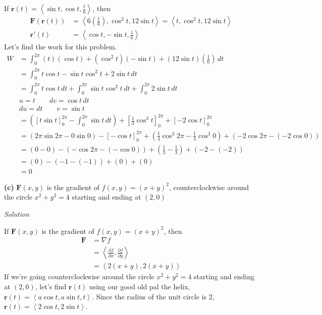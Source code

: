 \documentclass{article}
\newcommand{\lrp}[1]{\left( #1 \right)}
\newcommand{\lra}[1]{\left\langle #1 \right\rangle}
\newcommand{\lrb}[1]{\left[ #1 \right]}
\renewcommand{\r}[0]{\mathbf{r}}
\newcommand{\F}[0]{\mathbf{F}}
\newcommand{\Solution}{\textit{Solution}}
\begin{document}
If $\displaystyle\r(t)=\lra{\sin t, \cos t, \frac{t}{6}}$, then
\begin{align*}
    \F\lrp{\r(t)}&=\lra{6\lrp{\frac{t}{6}},\cos^2t,12\sin t}=\lra{t,\cos^2 t, 12\sin t}\\
    \r'(t)&=\lra{\cos t, -\sin t, \frac{1}{6}}
\end{align*}
Let's find the work for this problem.
\begin{align*}
    W&=\int_0^{2\pi} (t)(\cos t)+(\cos^2t)(- \sin t) + \lrp{12\sin t}\lrp{\frac{1}{6}}\,dt\\
    &=\int_0^{2\pi} t\cos t - \sin t\cos^2t + 2\sin t\,dt\\
    &=\int_0^{2\pi}t\cos t\,dt + \int_0^{2\pi}\sin t \cos ^2 t \,dt + \int_0^{2\pi} 2\sin t\,dt\\
    &u=t\hspace{2em}dv=\cos t\,dt\\
    &du=dt\hspace{2em}v=\sin t\\
    &=\lrp{\lrb{t\sin t}_0^{2\pi}-\int_0^{2\pi}\sin t\,dt}+\lrb{\frac{1}{3}\cos^3t}_0^{2\pi} +\lrb{-2\cos t}_0^{2\pi}\\
    &=\lrp{2\pi \sin 2\pi - 0\sin 0}-\lrb{-\cos t}_0^{2\pi}+\lrp{\frac{1}{3}\cos ^3 2\pi -\frac{1}{3}\cos^3 0 }+\lrp{-2 \cos 2\pi - (-2\cos 0)}\\
    &=(0-0)-\lrp{-\cos 2\pi - (-\cos 0)}+\lrp{\frac{1}{3}-\frac{1}{3}}+\lrp{-2 -(-2)}\\
    &=(0)-\lrp{-1-(-1)}+(0)+(0)\\
    &=\boxed{0}
\end{align*}

{}\textbf{(c)} $\F\lrp{x,y}$ is the gradient of $f(x,y)=(x+y)^2$, counterclockwise around the circle $x^2+y^2=4$ starting and ending at $(2,0)$

\Solution

If $\F\lrp{x,y}$ is the gradient of $f(x,y)=(x+y)^2$, then
\begin{align*}
    \F &= \nabla f\\
    &=\lra{\frac{\partial f}{\partial x},\frac{\partial f}{\partial y}}\\
    &=\lra{2(x+y),2(x+y)}
\end{align*}
If we're going counterclockwise around the circle $x^2+y^2=4$ starting and ending at $(2,0)$, let's find $\r(t)$ using our good old pal the helix, $\r(t)=\lra{a \cos t,a\sin t, t}$. Since the radius of the unit circle is $2$, $\r(t)=\lra{2\cos t, 2\sin t}$.
\end{document}
